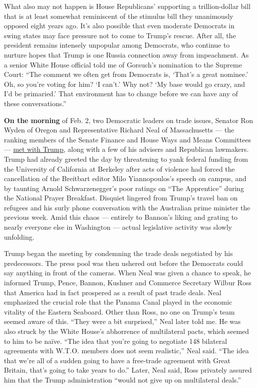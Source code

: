 What also may not happen is House Republicans' supporting a
trillion-dollar bill that is at least somewhat reminiscent of the
stimulus bill they unanimously opposed eight years ago. It's also
possible that even moderate Democrats in swing states may face pressure
not to come to Trump's rescue. After all, the president remains
intensely unpopular among Democrats, who continue to nurture hopes that
Trump is one Russia connection away from impeachment. As a senior White
House official told me of Gorsuch's nomination to the Supreme Court:
``The comment we often get from Democrats is, `That's a great nominee.'
Oh, so you're voting for him? `I can't.' Why not? `My base would go
crazy, and I'd be primaried.' That environment has to change before we
can have any of these conversations.''

\textbf{On the morning} of Feb. 2, two Democratic leaders on trade
issues, Senator Ron Wyden of Oregon and Representative Richard Neal of
Massachusetts --- the ranking members of the Senate Finance and House
Ways and Means Committees ---
\href{https://www.nytimes3xbfgragh.onion/2017/02/02/us/politics/trump-tax-imports.html}{met
with Trump}, along with a few of his advisers and Republican lawmakers.
Trump had already greeted the day by threatening to yank federal funding
from the University of California at Berkeley after acts of violence had
forced the cancellation of the Breitbart editor Milo Yiannopoulos's
speech on campus, and by taunting Arnold Schwarzenegger's poor ratings
on ``The Apprentice'' during the National Prayer Breakfast. Disquiet
lingered from Trump's travel ban on refugees and his surly phone
conversation with the Australian prime minister the previous week. Amid
this chaos --- entirely to Bannon's liking and grating to nearly
everyone else in Washington --- actual legislative activity was slowly
unfolding.

Trump began the meeting by condemning the trade deals negotiated by his
predecessors. The press pool was then ushered out before the Democrats
could say anything in front of the cameras. When Neal was given a chance
to speak, he informed Trump, Pence, Bannon, Kushner and Commerce
Secretary Wilbur Ross that America had in fact prospered as a result of
past trade deals. Neal emphasized the crucial role that the Panama Canal
played in the economic vitality of the Eastern Seaboard. Other than
Ross, no one on Trump's team seemed aware of this. ``They were a bit
surprised,'' Neal later told me. He was also struck by the White House's
abhorrence of multilateral pacts, which seemed to him to be naïve. ``The
idea that you're going to negotiate 148 bilateral agreements with W.T.O.
members does not seem realistic,'' Neal said. ``The idea that we're all
of a sudden going to have a free-trade agreement with Great Britain,
that's going to take years to do.'' Later, Neal said, Ross privately
assured him that the Trump administration ``would not give up on
multilateral deals.''

